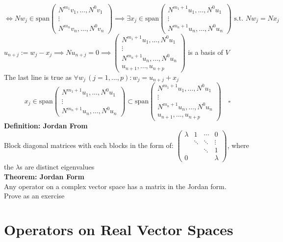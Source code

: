 \documentclass{article}
\newcommand{\st}{\mbox{ s.t. }}
\newcommand{\0}{{\bf{0}}}
\begin{document}
$$\iff Nw_j\in\mbox{span}\begin{pmatrix}
    N^{m_1}v_1,\dots,N^0v_1\\
    \vdots\\
    N^{m_n}v_n,\dots,N^0v_n
\end{pmatrix}\implies\exists x_j\in\mbox{span}\begin{pmatrix}
    N^{m_1+1}u_1,\dots,N^0u_1\\
    \vdots\\
    N^{m_n+1}u_n,\dots,N^0u_n
\end{pmatrix}\st Nw_j=Nx_j$$
$u_{n+j}:=w_j-x_j\implies Nu_{n+j}=0\implies\begin{pmatrix}
    N^{m_1+1}u_1,\dots,N^0u_1\\
    \vdots\\
    N^{m_n+1}u_n,\dots,N^0u_n\\
    u_{n+1},\dots,u_{n+p}
\end{pmatrix}$ is a basis of $V$\\
The last line is true as $\forall w_j\,(j=1,\dots,p):w_j=u_{n+j}+x_j$
$$x_j\in\mbox{span}\begin{pmatrix}
    N^{m_1+1}u_1,\dots,N^0u_1\\
    \vdots\\
    N^{m_n+1}u_n,\dots,N^0u_n
\end{pmatrix}\subset\mbox{span}\begin{pmatrix}
    N^{m_1+1}u_1,\dots,N^0u_1\\
    \vdots\\
    N^{m_n+1}u_n,\dots,N^0u_n\\
    u_{n+1},\dots,u_{n+p}
\end{pmatrix}\quad\square$$
\textbf{Definition: Jordan From}\\
Block diagonal matrices with each blocks in the form of: $\begin{pmatrix}
    \lambda&1&\cdots&0\\
    &\ddots&\ddots&\vdots\\
    &&\ddots&1\\
    0&&&\lambda
\end{pmatrix}$, where the $\lambda$s are distinct eigenvalues\\
\textbf{Theorem: Jordan Form}\\
Any operator on a complex vector space has a matrix in the Jordan form.\\
\null\hfill{Prove as an exercise}
\clearpage
\section{Operators on Real Vector Spaces}
\end{document}
